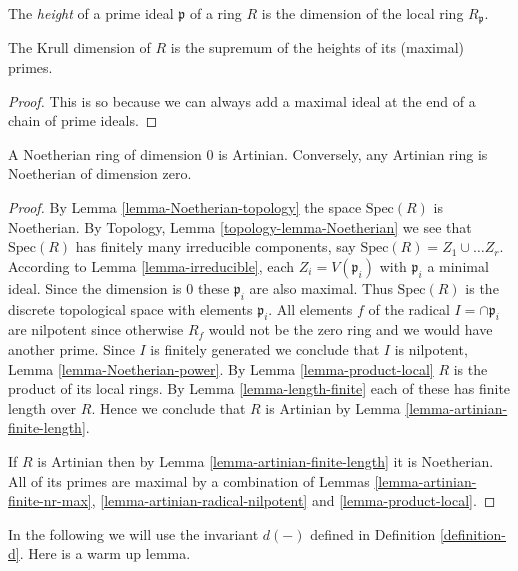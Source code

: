 \begin{definition}
\label{definition-height}
The {\it height} of a prime ideal $\mathfrak p$ of
a ring $R$ is the dimension of the local ring $R_{\mathfrak p}$.
\end{definition}

\begin{lemma}
\label{lemma-dimension-height}
The Krull dimension of $R$ is the supremum of the
heights of its (maximal) primes.
\end{lemma}

\begin{proof}
This is so because we can always add a maximal ideal at the end of a chain
of prime ideals.
\end{proof}

\begin{lemma}
\label{lemma-Noetherian-dimension-0}
A Noetherian ring of dimension $0$ is Artinian.
Conversely, any Artinian ring is Noetherian of dimension zero.
\end{lemma}

\begin{proof}
By Lemma \ref{lemma-Noetherian-topology} the space $\text{Spec}(R)$
is Noetherian. By Topology, Lemma \ref{topology-lemma-Noetherian} we see
that $\text{Spec}(R)$ has finitely many irreducible
components, say $\text{Spec}(R) = Z_1 \cup \ldots Z_r$.
According to Lemma \ref{lemma-irreducible}, each $Z_i = V(\mathfrak p_i)$
with $\mathfrak p_i$ a minimal ideal. Since the dimension is $0$
these $\mathfrak p_i$ are also maximal. Thus $\text{Spec}(R)$
is the discrete topological space with elements $\mathfrak p_i$.
All elements $f$ of the radical $I = \cap \mathfrak p_i$
are nilpotent since otherwise $R_f$ would not be the zero ring
and we would have another prime. Since $I$ is finitely generated
we conclude that $I$ is nilpotent, Lemma \ref{lemma-Noetherian-power}.
By Lemma \ref{lemma-product-local} $R$ is the product of its
local rings. By Lemma \ref{lemma-length-finite} each of these
has finite length over $R$. Hence we conclude that $R$
is Artinian by Lemma \ref{lemma-artinian-finite-length}.

\medskip\noindent
If $R$ is Artinian then by Lemma \ref{lemma-artinian-finite-length}
it is Noetherian. All of its primes are maximal by a combination
of Lemmas \ref{lemma-artinian-finite-nr-max},
\ref{lemma-artinian-radical-nilpotent} and \ref{lemma-product-local}.
\end{proof}

\noindent
In the following we will use the invariant $d(-)$ defined
in Definition \ref{definition-d}. Here is a warm up lemma.

